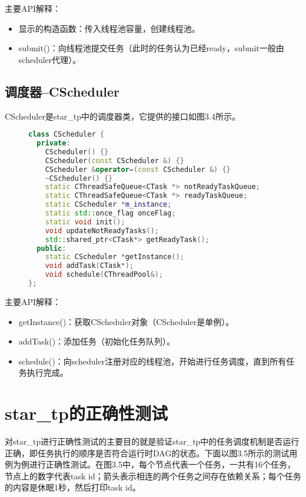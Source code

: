 主要API解释：

\begin{itemize}
	\item 显示的构造函数：传入线程池容量，创建线程池。
	\item submit()：向线程池提交任务（此时的任务认为已经ready，submit一般由scheduler代理）。
\end{itemize}

\subsection{调度器--CScheduler}

CScheduler是star\_tp中的调度器类，它提供的接口如图3.4所示。

\begin{figure}[!htbp]
    \centering
\begin{lstlisting}[language=c++,caption={}]
class CScheduler {
  private:
    CScheduler() {}
    CScheduler(const CScheduler &) {}
    CScheduler &operator=(const CScheduler &) {}
    ~CScheduler() {}
    static CThreadSafeQueue<CTask *> notReadyTaskQueue;
    static CThreadSafeQueue<CTask *> readyTaskQueue;
    static CScheduler *m_instance;
    static std::once_flag onceFlag;
    static void init();
    void updateNotReadyTasks();
    std::shared_ptr<CTask*> getReadyTask();
  public:
    static CScheduler *getInstance();
    void addTask(CTask*);
    void schedule(CThreadPool&);
};
\end{lstlisting}
    \label{fig:3_cscheduler}
\end{figure}

主要API解释：

\begin{itemize}
	\item getInstance()：获取CScheduler对象（CScheduler是单例）。
	\item addTask()：添加任务（初始化任务队列）。
	\item schedule()：向scheduler注册对应的线程池，开始进行任务调度，直到所有任务执行完成。
\end{itemize}

\section{star\_tp的正确性测试}

对star\_tp进行正确性测试的主要目的就是验证star\_tp中的任务调度机制是否运行正确，即任务执行的顺序是否符合运行时DAG的状态。下面以图3.5所示的测试用例为例进行正确性测试。在图3.5中，每个节点代表一个任务，一共有16个任务，节点上的数字代表task id；箭头表示相连的两个任务之间存在依赖关系；每个任务的内容是休眠1秒，然后打印task id。


